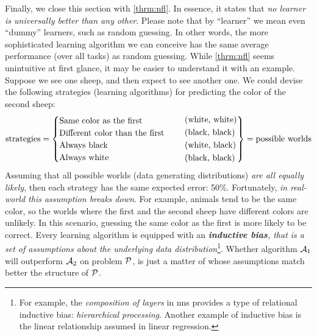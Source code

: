 Finally, we close this section with \Theorem{} \ref{thrm:nfl}. In essence, it
states that \emph{no learner is universally better than any
other}. Please note that by ``learner'' we mean even ``dummy'' learners, such as
random guessing. In other words, the more sophisticated
learning algorithm we can conceive has the same average performance (over all
tasks) as random guessing. While \Theorem{} \ref{thrm:nfl} seems unintuitive at
first glance, it may be easier to understand it with an example. Suppose we see
one sheep, and then expect to see another one.  We could devise the following
strategies (learning algorithms) for predicting the color of the second sheep:
\begin{equation}
	\label{eq:nfl}
	\text{strategies} = 
	\begin{cases}
		\text{Same color as the first} \\
		\text{Different color than the first} \\
		\text{Always black} \\
		\text{Always white} \\
	\end{cases}
	\quad
	\begin{rcases}
		\text{(white, white)} \\
		\text{(black, black)} \\
		\text{(white, black)} \\
		\text{(black, black)} \\
	\end{rcases}
	= \text{possible worlds}
\end{equation}
Assuming that all possible worlds (data generating distributions) \emph{are all
equally likely}, then each strategy has the same expected error: 50\%.
Fortunately, \emph{in real-world this assumption breaks down}. For example,
animals tend to be the same color, so the worlds where the first and the second
sheep have different colors are unlikely. In this scenario, guessing the same
color as the first is more likely to be correct. Every learning algorithm is
equipped with an \emph{\textbf{inductive bias}, that is a set of assumptions about the
underlying data distribution}\footnote{For example, the \emph{composition of
layers} in \glspl{nn} provides a type of relational inductive bias:
\emph{hierarchical processing}. Another example of inductive bias is the linear
relationship assumed in linear regression.}. Whether
algorithm $\mathcal{A}_1$ will outperform $\mathcal{A}_2$ on problem $\mathcal{P}$, is just
a matter of whose assumptions match better the structure of $\mathcal{P}$.


